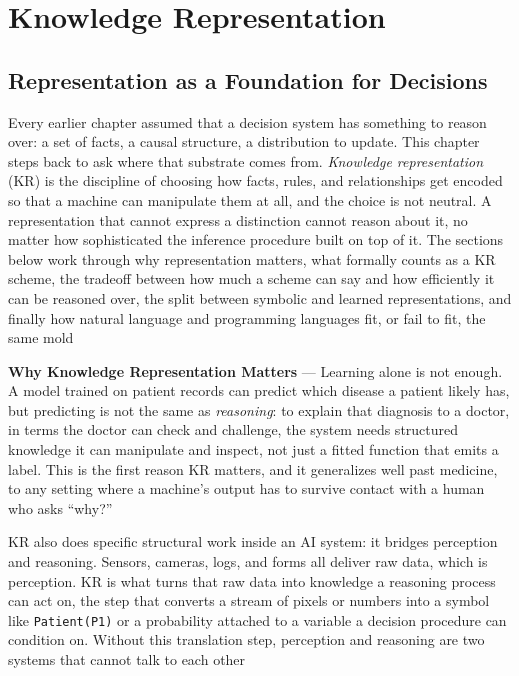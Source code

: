 
\chapter{Knowledge Representation}
\label{chap:knowledge-representation}


\section{Representation as a Foundation for Decisions}
\label{sec:representation-foundation-decisions}

Every earlier chapter assumed that a decision system has something to reason
over: a set of facts, a causal structure, a distribution to update. This chapter
steps back to ask where that substrate comes from. \emph{Knowledge representation}
(KR) is the discipline of choosing how facts, rules, and relationships get
encoded so that a machine can manipulate them at all, and the choice is not
neutral. A representation that cannot express a distinction cannot reason
about it, no matter how sophisticated the inference procedure built on top of
it. The sections below work through why representation matters, what
formally counts as a KR scheme, the tradeoff between how much a scheme can say
and how efficiently it can be reasoned over, the split between symbolic and
learned representations, and finally how natural language and programming
languages fit, or fail to fit, the same mold

\textbf{Why Knowledge Representation Matters} --- Learning alone is not
enough. A model trained on patient records can predict which disease a
patient likely has, but predicting is not the same as \emph{reasoning}: to
explain that diagnosis to a doctor, in terms the doctor can check and
challenge, the system needs structured knowledge it can manipulate and
inspect, not just a fitted function that emits a label. This is the first
reason KR matters, and it generalizes well past medicine, to any setting
where a machine's output has to survive contact with a human who asks
``why?''

KR also does specific structural work inside an AI system: it bridges
perception and reasoning. Sensors, cameras, logs, and forms all deliver raw
data, which is perception. KR is what turns that raw data into knowledge a
reasoning process can act on, the step that converts a stream of pixels or
numbers into a symbol like \texttt{Patient(P1)} or a probability attached to
a variable a decision procedure can condition on. Without this translation
step, perception and reasoning are two systems that cannot talk to each
other


